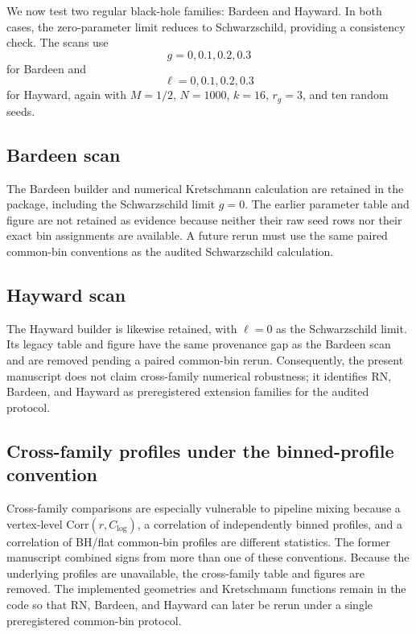 \documentclass[11pt,a4paper]{article}
\begin{document}
We now test two regular black-hole families: Bardeen and Hayward. In both cases, the zero-parameter limit reduces to Schwarzschild, providing a consistency check. The scans use
\begin{equation}
    g=0,0.1,0.2,0.3
\end{equation}
for Bardeen and
\begin{equation}
    \ell=0,0.1,0.2,0.3
\end{equation}
for Hayward, again with $M=1/2$, $N=1000$, $k=16$, $r_g=3$, and ten random seeds.

\subsection{Bardeen scan}

The Bardeen builder and numerical Kretschmann calculation are retained in the package, including the Schwarzschild limit $g=0$. The earlier parameter table and figure are not retained as evidence because neither their raw seed rows nor their exact bin assignments are available. A future rerun must use the same paired common-bin conventions as the audited Schwarzschild calculation.

\subsection{Hayward scan}

The Hayward builder is likewise retained, with $\ell=0$ as the Schwarzschild limit. Its legacy table and figure have the same provenance gap as the Bardeen scan and are removed pending a paired common-bin rerun. Consequently, the present manuscript does not claim cross-family numerical robustness; it identifies RN, Bardeen, and Hayward as preregistered extension families for the audited protocol.

\subsection{Cross-family profiles under the binned-profile convention}
\label{sec:cross-family-profiles}

Cross-family comparisons are especially vulnerable to pipeline mixing because a vertex-level $\mathrm{Corr}(r,C_{\log})$, a correlation of independently binned profiles, and a correlation of BH/flat common-bin profiles are different statistics. The former manuscript combined signs from more than one of these conventions. Because the underlying profiles are unavailable, the cross-family table and figures are removed. The implemented geometries and Kretschmann functions remain in the code so that RN, Bardeen, and Hayward can later be rerun under a single preregistered common-bin protocol.
\end{document}
